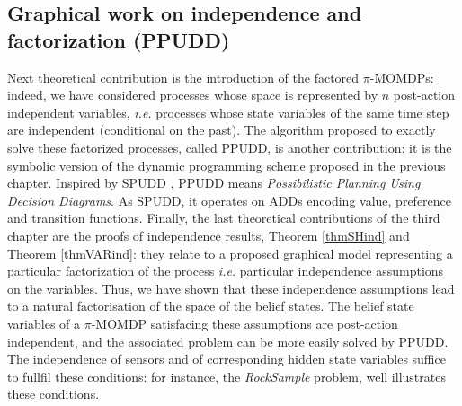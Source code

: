 \subsection*{Graphical work on independence and factorization (PPUDD)}
Next theoretical contribution is 
the introduction of the factored $\pi$-MOMDPs:
indeed, we have considered processes
whose space is represented by $n$ 
post-action independent variables,
\textit{i.e.} processes whose 
state variables of the same time step
are independent (conditional on the past).
The algorithm proposed to exactly solve 
these factorized processes,
called PPUDD, is another contribution:
it is the symbolic version of 
the dynamic programming scheme 
proposed in the previous chapter.
Inspired by SPUDD \cite{Hoey99spudd:stochastic}, 
PPUDD means \emph{Possibilistic Planning Using Decision Diagrams}. 
As SPUDD, it operates on ADDs 
encoding value, preference and transition functions.
Finally, the last theoretical contributions of the third chapter
are the proofs of independence results,
Theorem \ref{thmSHind} and Theorem \ref{thmVARind}:
they relate to a proposed graphical model
representing a particular factorization of the process
\textit{i.e.} particular independence assumptions
on the variables.
Thus, we have shown that 
these independence assumptions
lead to a natural factorisation 
of the space of the belief states.
The belief state variables of a $\pi$-MOMDP 
satisfacing these assumptions
are post-action independent,
and the associated problem 
can be more easily solved by PPUDD. 
The independence of sensors 
and of corresponding hidden state variables 
suffice to fullfil these conditions:
for instance, the \textit{RockSample} problem, 
well illustrates these conditions.

